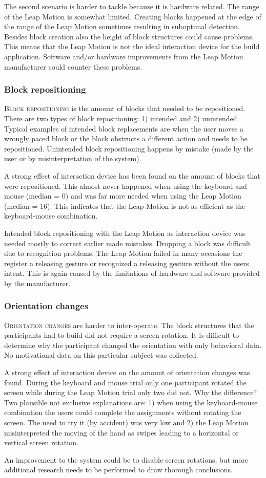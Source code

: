 The second scenario is harder to tackle because it is hardware related. The range of the Leap Motion is somewhat limited. Creating blocks happened at the edge of the range of the 
Leap Motion sometimes resulting in suboptimal detection. Besides block creation also the height of block structures could cause problems. This means that the Leap Motion is not 
the ideal interaction device for the build application. Software and/or hardware improvements from the Leap Motion manufacturer could counter these problems.

\subsubsection{Block repositioning}
\textsc{Block repositioning} is the amount of blocks that needed to be repositioned. There are two types of block repositioning: 1) intended and 2) unintended. Typical examples 
of intended block replacements are when the user moves a wrongly paced block or the block obstructs a different action and needs to be repositioned. Unintended block repositioning
 happens by mistake (made by the user or by misinterpretation of the system).

A strong effect of interaction device has been found on the amount of blocks that were repositioned. This almost never happened when using the keyboard and mouse (median = 0) 
and was far more needed when using the Leap Motion (median = 16). This indicates that the Leap Motion is not as efficient as the keyboard-mouse combination.

Intended block repositioning with the Leap Motion as interaction device was needed mostly to correct earlier made mistakes. Dropping a block was difficult due to recognition 
problems. The Leap Motion failed in many occasions the register a releasing gesture or recognized a releasing gesture without the users intent. This is again caused by the 
limitations of hardware and software provided by the manufacturer.

\subsubsection{Orientation changes} 
\textsc{Orientation changes} are harder to inter-operate. The block structures that the participants had to build did not require a screen rotation. It is difficult to determine 
why the participant changed the orientation with only behavioral data. No motivational data on this particular subject was collected.

A strong effect of interaction device on the amount of orientation changes was found. During the keyboard and mouse trial only one participant rotated the screen while during 
the Leap Motion trial only two did not. Why the difference? Two plausible not exclusive explanations are: 1) when using the keyboard-mouse combination the users could complete 
the assignments without rotating the screen. The need to try it (by accident) was very low and 2) the Leap Motion misinterpreted the moving of the hand as swipes leading 
to a horizontal or vertical screen rotation. 

An improvement to the system could be to disable screen rotations, but more additional research needs to be performed to draw thorough conclusions.

